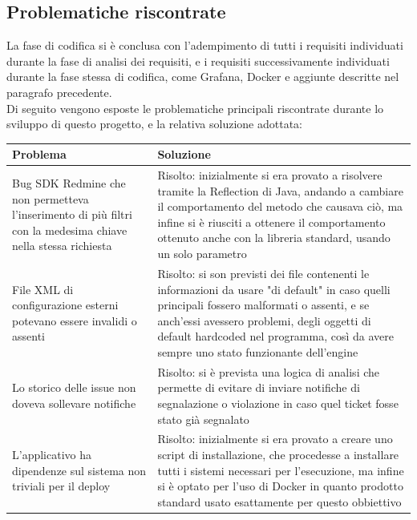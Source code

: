 	\subsection{Problematiche riscontrate}
		La fase di codifica si è conclusa con l'adempimento di tutti i requisiti individuati durante la fase di analisi dei requisiti, e i requisiti successivamente individuati durante la fase stessa di codifica, come Grafana, Docker e aggiunte descritte nel paragrafo precedente.\\
		Di seguito vengono esposte le problematiche principali riscontrate durante lo sviluppo di questo progetto, e la relativa soluzione adottata:
		 \begin{center}
			\begin{longtable}{|p{7cm}|p{7cm}|}
				\hline
				\rowcolor{lighter-grayer}
				\textbf{Problema} & \textbf{Soluzione} \\
				\hline
				\endfirsthead
				Bug SDK Redmine che non permetteva l'inserimento di più filtri con la medesima chiave nella stessa richiesta & Risolto: inizialmente si era provato a risolvere tramite la Reflection di Java, andando a cambiare il comportamento del metodo che causava ciò, ma infine si è riusciti a ottenere il comportamento ottenuto anche con la libreria standard, usando un solo parametro\\ \hline
				File XML di configurazione esterni potevano essere invalidi o assenti & Risolto: si son previsti dei file contenenti le informazioni da usare "di default" in caso quelli principali fossero malformati o assenti, e se anch'essi avessero problemi, degli oggetti di default hardcoded nel programma, così da avere sempre uno stato funzionante dell'engine\\ \hline
				Lo storico delle issue non doveva sollevare notifiche & Risolto: si è prevista una logica di analisi che permette di evitare di inviare notifiche di segnalazione o violazione in caso quel ticket fosse stato già segnalato \\ \hline
				L'applicativo ha dipendenze sul sistema non triviali per il deploy & Risolto: inizialmente si era provato a creare uno script di installazione, che procedesse a installare tutti i sistemi necessari per l'esecuzione, ma infine si è optato per l'uso di Docker in quanto prodotto standard usato esattamente per questo obbiettivo \\ \hline
			\end{longtable}
		\end{center}